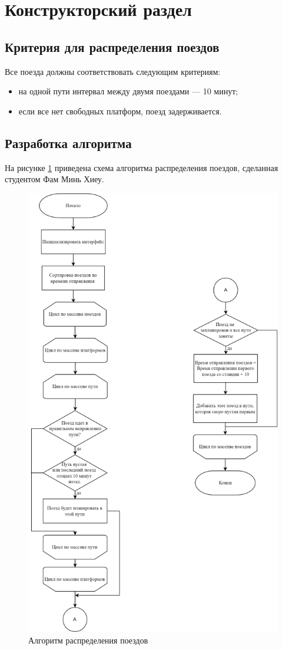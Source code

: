 \section{Конструкторский раздел}
\subsection{Критерия для распределения поездов}
Все поезда должны соответствовать следующим критериям:
\begin{itemize}
	\item на одной пути интервал между двумя поездами --- 10 минут;
	\item если все нет свободных платформ, поезд задерживается.
\end{itemize}
\subsection{Разработка алгоритма}

На рисунке \ref{img:schedule} приведена схема алгоритма распределения поездов, сделанная студентом Фам Минь Хиеу.

\begin{figure}[h]
	\centering
	\includegraphics[height=0.7\textheight]{img/schedule.png}
	\caption{Алгоритм распределения поездов}
	\label{img:schedule}
\end{figure}